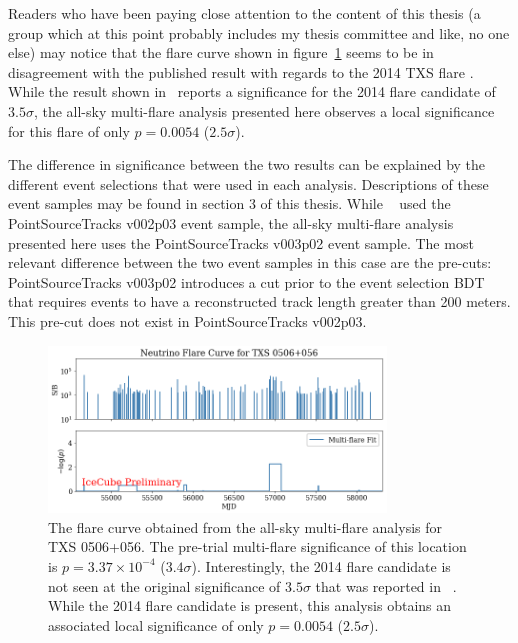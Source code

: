 Readers who have been paying close attention to the content of this thesis (a group which at this point probably includes my thesis committee and like, no one else) may notice that the flare curve shown in figure~\ref{fig:fcurve_txs} seems to be in disagreement with the published result with regards to the 2014 TXS flare . While the result shown in~\cite{TXS_Archival} reports a significance for the 2014 flare candidate of $3.5 \sigma$, the all-sky multi-flare analysis presented here observes a local significance for this flare of only $p=0.0054$ ($2.5 \sigma$).

The difference in significance between the two results can be explained by the different event selections that were used in each analysis. Descriptions of these event samples may be found in section 3 of this thesis. While ~\cite{TXS_Multimessenger} used the PointSourceTracks v002p03 event sample, the all-sky multi-flare analysis presented here uses the PointSourceTracks v003p02 event sample. The most relevant difference between the two event samples in this case are the pre-cuts: PointSourceTracks v003p02 introduces a cut prior to the event selection BDT that requires events to have a reconstructed track length greater than 200 meters. This pre-cut does not exist in PointSourceTracks v002p03. 

\begin{figure}[h]
\centering
\includegraphics[width=0.8\textwidth]{figs/fcurve_TXS.png}
\caption{The flare curve obtained from the all-sky multi-flare analysis for TXS 0506+056. The pre-trial multi-flare significance of this location is $p=3.37 \times 10^{-4}$ ($3.4 \sigma$). Interestingly, the 2014 flare candidate is not seen at the original significance of $3.5 \sigma$ that was reported in ~\cite{TXS_Multimessenger}. While the 2014 flare candidate is present, this analysis obtains an associated local significance of only $p=0.0054$ ($2.5 \sigma$). }
\label{fig:fcurve_txs}
\end{figure}

